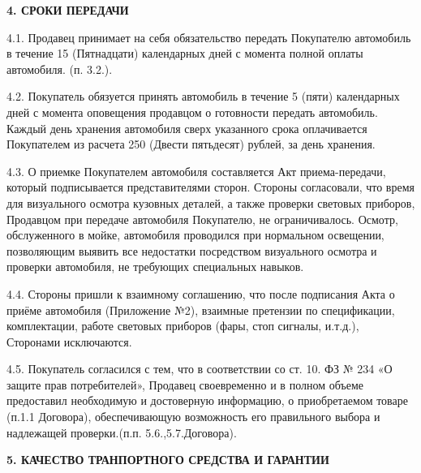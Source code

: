 \documentclass[a4paper,12pt]{article}
\begin{document}
 \begin{center}
 \vspace{1 ex}
 \textbf{4. СРОКИ ПЕРЕДАЧИ }
 \vspace{1ex}
    \end{center}
\begin{description}\item4.1. Продавец принимает на себя обязательство передать Покупателю автомобиль в течение 15 (Пятнадцати) календарных дней с момента полной оплаты автомобиля. (п. 3.2.). \end{description}
\begin{description}\item4.2. Покупатель обязуется принять автомобиль в течение 5 (пяти) календарных дней с момента оповещения продавцом о готовности передать автомобиль. Каждый день хранения автомобиля сверх указанного срока оплачивается Покупателем из расчета 250 (Двести пятьдесят) рублей, за день хранения. \end{description}

\begin{description}\item4.3. О приемке Покупателем автомобиля составляется Акт приема-передачи, который подписывается представителями сторон. Стороны согласовали, что время для визуального осмотра кузовных деталей, а также проверки световых приборов, Продавцом при передаче автомобиля Покупателю, не ограничивалось. Осмотр, обслуженного в мойке, автомобиля проводился при нормальном освещении, позволяющим выявить все недостатки посредством визуального осмотра и проверки автомобиля, не требующих специальных навыков.\end{description}
\begin{description}\item4.4.  Стороны пришли к взаимному соглашению, что после подписания Акта о приёме автомобиля (Приложение №2), взаимные претензии по спецификации, комплектации, работе световых приборов (фары, стоп сигналы, и.т.д.), Сторонами исключаются.\end{description}
\begin{description}\item4.5. Покупатель согласился с тем, что в соответствии со ст. 10. ФЗ № 234 «О защите прав потребителей», Продавец своевременно и в полном объеме предоставил необходимую и достоверную информацию,  о приобретаемом товаре (п.1.1  Договора), обеспечивающую возможность его правильного выбора и надлежащей проверки.(п.п. 5.6.,5.7.Договора). \end{description}
 \newpage
 \begin{center}
 \vspace{1 ex}
 \textbf{5. КАЧЕСТВО ТРАНПОРТНОГО СРЕДСТВА И ГАРАНТИИ }
 \vspace{1ex}
    \end{center}
\end{document}

